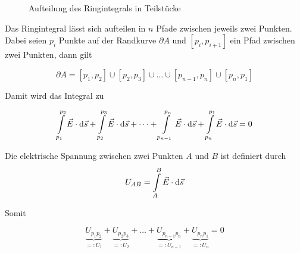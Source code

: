 \begin{figure}[H]
  \begin{center}
    \caption{Aufteilung des Ringintegrals in Teilstücke}
  \end{center}
\end{figure}

Das Ringintegral lässt sich aufteilen in $n$ Pfade zwischen jeweils zwei
Punkten. Dabei seien $p_i$ Punkte auf der Randkurve $\partial A$ und $[p_{i},
p_{i+1}]$ ein Pfad zwischen zwei Punkten, dann gilt

\begin{equation}
  \partial A = [p_1, p_2] \cup [p_2, p_3] \cup \dots \cup [p_{n-1}, p_n] \cup [p_n, p_1]
\end{equation}

Damit wird das Integral zu

\begin{equation}
  \int\limits_{p_1}^{p_2} \vec{E} \cdot \dif \vec{s} +
  \int\limits_{p_2}^{p_3} \vec{E} \cdot \dif \vec{s} +
  \dots +
  \int\limits_{p_{n-1}}^{p_n} \vec{E} \cdot \dif \vec{s} +
  \int\limits_{p_{n}}^{p_1} \vec{E} \cdot \dif \vec{s}
  = 0
\end{equation}

Die elektrische Spannung zwischen zwei Punkten $A$ und $B$ ist definiert durch
\begin{equation}
  U_{AB} = \int\limits_A^B \vec{E} \cdot \dif \vec{s}
\end{equation}

Somit

\begin{equation}
  \underbrace{U_{p_1p_2}}_{=: U_1} +
  \underbrace{U_{p_2p_3}}_{=: U_2} +
  \dots +
  \underbrace{U_{p_{n-1}p_n}}_{=: U_{n-1}} +
  \underbrace{U_{p_np_1}}_{=: U_n} = 0
\end{equation}

